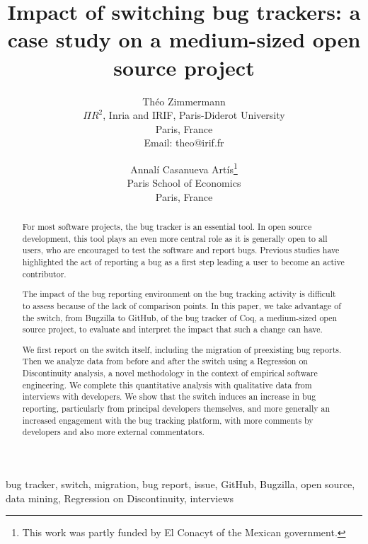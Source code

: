 \documentclass[conference]{IEEEtran}
\begin{document}
%
\title{Impact of switching bug trackers: a case study on a medium-sized open source project}
%
\author{Th\'eo Zimmermann\\
$\Pi R^2$, Inria and
IRIF, Paris-Diderot University\\
Paris, France\\
Email: theo@irif.fr
\and
Annal\'i Casanueva Art\'is\thanks{This work was partly funded by El Conacyt of the Mexican government.}\\
Paris School of Economics\\
Paris, France}
%
\maketitle
%
\begin{abstract}
For most software projects, the bug tracker is an essential tool. In open source development, this tool plays an even more central role as it is generally open to all users, who are encouraged to test the software and report bugs. Previous studies have highlighted the act of reporting a bug as a first step leading a user to become an active contributor.

The impact of the bug reporting environment on the bug tracking activity is difficult to assess because of the lack of comparison points. In this paper, we take advantage of the switch, from Bugzilla to GitHub, of the bug tracker of Coq, a medium-sized open source project, to evaluate and interpret the impact that such a change can have.

We first report on the switch itself, including the migration of preexisting bug reports. Then we analyze data from before and after the switch using a Regression on Discontinuity analysis, a novel methodology in the context of empirical software engineering. We complete this quantitative analysis with qualitative data from interviews with developers.
We show that the switch induces an increase in bug reporting, particularly from principal developers themselves, and more generally an increased engagement with the bug tracking platform, with more comments by developers and also more external commentators.
\end{abstract}


\begin{IEEEkeywords}
bug tracker, switch, migration, bug report, issue, GitHub, Bugzilla, open source, data mining, Regression on Discontinuity, interviews
\end{IEEEkeywords}
%
%
%
\end{document}
